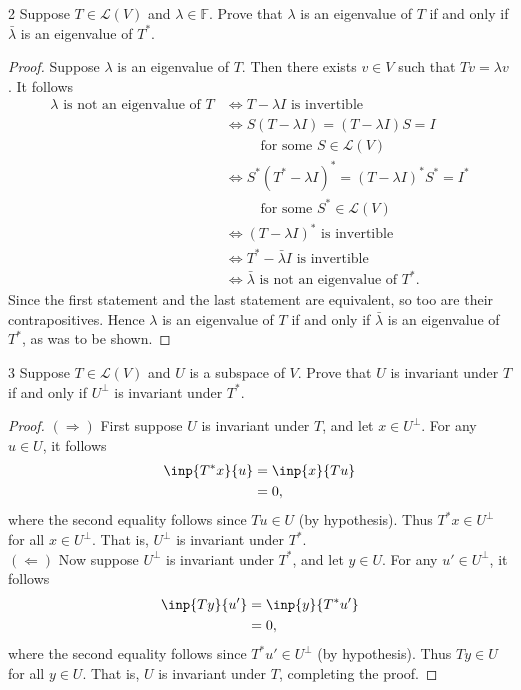 \documentclass{extarticle}
\newenvironment{problem}[1]{\begin{prob*}{#1}{}}{\end{prob*}}
\newcommand{\F}{\mathbb{F}}
\newcommand{\Hom}{\mathcal{L}}
\begin{document}
\begin{problem}{2}
Suppose $T\in\Hom(V)$ and $\lambda\in\F$.  Prove that $\lambda$ is an eigenvalue of $T$ if and only if $\bar{\lambda}$ is an eigenvalue of $T^\ast$.
\end{problem}
\begin{proof}
Suppose $\lambda$ is an eigenvalue of $T$.  Then there exists $v\in V$ such that $Tv = \lambda v$.  It follows
\begin{align*}
\lambda \text{ is not an eigenvalue of }T &\iff T - \lambda I\text{ is invertible}\\
&\iff S(T - \lambda I) = (T- \lambda I)S = I \\
&~~~~~~~~~~\text{ for some }S\in\Hom(V)\\
&\iff S^\ast(T^\ast - \lambda I)^\ast = (T- \lambda I)^\ast S^\ast = I^\ast\\
&~~~~~~~~~~\text{ for some }S^\ast\in\Hom(V)\\
&\iff (T - \lambda I)^\ast\text{ is invertible}\\
&\iff T^\ast - \bar{\lambda}I \text{ is invertible}\\
&\iff \bar{\lambda} \text{ is not an eigenvalue of }T^\ast.
\end{align*}
Since the first statement and the last statement are equivalent, so too are their contrapositives.  Hence $\lambda$ is an eigenvalue of $T$ if and only if $\bar{\lambda}$ is an eigenvalue of $T^\ast$, as was to be shown.
\end{proof}

\begin{problem}{3}
Suppose $T\in\Hom(V)$ and $U$ is a subspace of $V$.  Prove that $U$ is invariant under $T$ if and only if $U^\perp$ is invariant under $T^\ast$.
\end{problem}
\begin{proof}
$(\Rightarrow)$ First suppose $U$ is invariant under $T$, and let $x\in U^\perp$.  For any $u\in U$, it follows
\begin{align*}
\inp{T^\ast x}{u} &= \inp{x}{Tu}\\
&= 0,
\end{align*}
where the second equality follows since $Tu\in U$ (by hypothesis).  Thus $T^\ast x\in U^\perp$ for all $x\in U^\perp$.  That is, $U^\perp$ is invariant under $T^\ast$.\\
\indent $(\Leftarrow)$ Now suppose $U^\perp$ is invariant under $T^\ast$, and let $y\in U$.  For any $u'\in U^\perp$, it follows
\begin{align*}
\inp{T y}{u'} &= \inp{y}{T^\ast u'}\\
&= 0,
\end{align*}
where the second equality follows since $T^\ast u'\in U^\perp$ (by hypothesis).  Thus $T y\in U$ for all $y\in U$.  That is, $U$ is invariant under $T$, completing the proof.
\end{proof}
\end{document}
